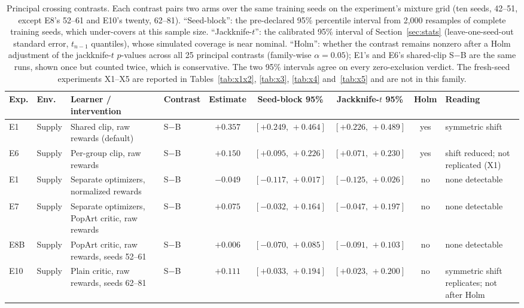 \begin{table}[!htbp]
\caption{Principal crossing contrasts. Each contrast pairs two arms over the same training seeds on the experiment's mixture grid (ten seeds, 42--51, except E8's 52--61 and E10's twenty, 62--81). ``Seed-block'': the pre-declared 95\% percentile interval from 2,000 resamples of complete training seeds, which under-covers at this sample size. ``Jackknife-$t$'': the calibrated 95\% interval of Section~\ref{sec:stats} (leave-one-seed-out standard error, $t_{n-1}$ quantiles), whose simulated coverage is near nominal. ``Holm'': whether the contrast remains nonzero after a Holm adjustment of the jackknife-$t$ $p$-values across all 25 principal contrasts (family-wise $\alpha=0.05$); E1's and E6's shared-clip S$-$B are the same runs, shown once but counted twice, which is conservative. The two 95\% intervals agree on every zero-exclusion verdict. The fresh-seed experiments X1--X5 are reported in Tables~\ref{tab:x1x2}, \ref{tab:x3}, \ref{tab:x4} and~\ref{tab:x5} and are not in this family.}
\label{tab:results}
\centering\scriptsize
\setlength{\tabcolsep}{4pt}
\begin{tabular}{@{}ll>{\raggedright\arraybackslash}p{}lcccc >{\raggedright\arraybackslash}p{}@{}}
\toprule
Exp. & Env. & Learner / intervention & Contrast & Estimate & Seed-block 95\% & Jackknife-$t$ 95\% & Holm & Reading \\
\midrule
E1 & Supply & Shared clip, raw rewards (default) & S$-$B & $+0.357$ & $[+0.249,\,+0.464]$ & $[+0.226,\,+0.489]$ & yes & symmetric shift \\
E6 & Supply & Per-group clip, raw rewards & S$-$B & $+0.150$ & $[+0.095,\,+0.226]$ & $[+0.071,\,+0.230]$ & yes & shift reduced; not replicated (X1) \\
E1 & Supply & Separate optimizers, normalized rewards & S$-$B & $-0.049$ & $[-0.117,\,+0.017]$ & $[-0.125,\,+0.026]$ & no & none detectable \\
E7 & Supply & Separate optimizers, PopArt critic, raw rewards & S$-$B & $+0.075$ & $[-0.032,\,+0.164]$ & $[-0.047,\,+0.197]$ & no & none detectable \\
E8B & Supply & PopArt critic, raw rewards, seeds 52--61 & S$-$B & $+0.006$ & $[-0.070,\,+0.085]$ & $[-0.091,\,+0.103]$ & no & none detectable \\
E10 & Supply & Plain critic, raw rewards, seeds 62--81 & S$-$B & $+0.111$ & $[+0.033,\,+0.194]$ & $[+0.023,\,+0.200]$ & no & symmetric shift replicates; not after Holm \\

\end{tabular}
\end{table}
